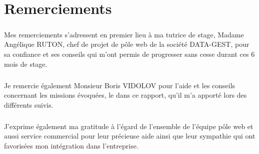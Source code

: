 \chapter*{Remerciements}
\setlength{\parskip}{0.5\baselineskip}




\paragraph{}
Mes remerciements s’adressent en premier lieu à ma tutrice de stage,  Madame Angélique RUTON, chef de projet de pôle web de la société DATA-GEST, pour sa confiance et ses conseils qui m’ont permis de progresser sans cesse durant ces 6 mois de stage.

\paragraph{} 
Je remercie également Monsieur Boris VIDOLOV pour l’aide et les conseils concernant les missions évoquées, le dans ce rapport, qu’il m’a apporté lors des différents suivis.

\paragraph{} 
J’exprime également ma gratitude à l’égard de l’ensemble de l'équipe pôle web et aussi service commercial pour leur précieuse aide ainsi que leur sympathie qui ont favorisées mon intégration dans l’entreprise.
